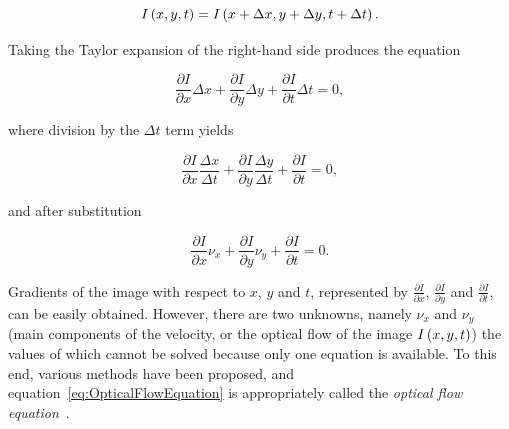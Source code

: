 \begin{equation}
    {I} \left( x, y, t \right) = {I} \left( x + \Delta x, y + \Delta y, t + \Delta t \right).
\end{equation}

\noindent Taking the Taylor expansion of the right-hand side produces the equation

\begin{equation}
    \frac{\partial I}{\partial x} \Delta x +
    \frac{\partial I}{\partial y} \Delta y +
    \frac{\partial I}{\partial t} \Delta t =
    0,
\end{equation}

\noindent where division by the $\Delta t$ term yields

\begin{equation}
    \frac{\partial I}{\partial x} \frac{\Delta x}{\Delta t} +
    \frac{\partial I}{\partial y} \frac{\Delta y}{\Delta t} +
    \frac{\partial I}{\partial t} = 0,
\end{equation}

\noindent and after substitution

\begin{equation}
    \label{eq:OpticalFlowEquation}
    \frac{\partial I}{\partial x} \nu_x +
    \frac{\partial I}{\partial y} \nu_y +
    \frac{\partial I}{\partial t} =
    0.
\end{equation}

Gradients of the image with respect to $x$, $y$ and $t$, represented by $\frac{\partial I}{\partial x}$, $\frac{\partial I}{\partial y}$ and $\frac{\partial I}{\partial t}$, can be easily obtained. However, there are two unknowns, namely $\nu_x$ and $\nu_y$ (main components of the velocity, or the optical flow of the image ${I} \left( x, y, t \right)$) the values of which cannot be solved because only one equation is available. To this end, various methods have been proposed, and equation~\ref{eq:OpticalFlowEquation} is appropriately called the \emph{optical flow equation}~\cite{fleet2006optical}.
